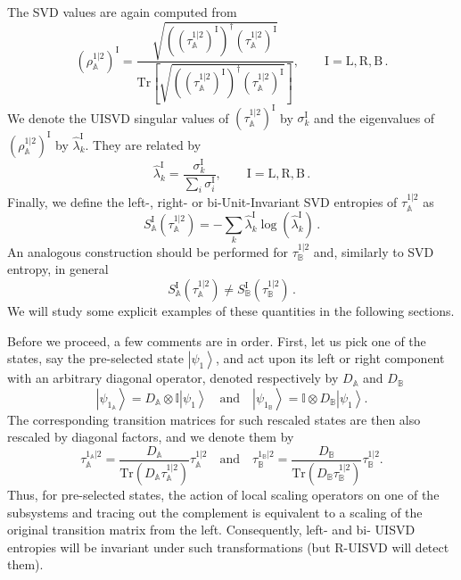 \documentclass[11pt,a4paper]{article}
\newcommand{\be}{\begin{equation}}
\newcommand{\ee}{\end{equation}}
\newcommand{\Tr}{\text{Tr}}
\newcommand{\ket}[1]{\left|#1\right\rangle}
\begin{document}
The SVD values are again computed from
\be
(\rho_\mathbb{A}^{1|2})^\mathrm{I}=\frac{\sqrt{((\tau_\mathbb{A}^{1|2})^\mathrm{I})^\dagger (\tau_\mathbb{A}^{1|2})^\mathrm{I}}}{\Tr\left[\sqrt{((\tau_\mathbb{A}^{1|2})^\mathrm{I})^\dagger (\tau_\mathbb{A}^{1|2})^\mathrm{I}}\right]},\qquad \mathrm{I}=\mathrm{L},\mathrm{R},\mathrm{B}\,.
\ee
We denote the UISVD singular values of $(\tau^{1|2}_\mathbb{A})^\mathrm{I}$ by $\sigma^\mathrm{I}_k$ and the eigenvalues of $(\rho_\mathbb{A}^{1|2})^\mathrm{I}$ by $\hat{\lambda}^\mathrm{I}_k$. They are related by 
\be
\hat{\lambda}^\mathrm{I}_k=\frac{\sigma^\mathrm{I}_k}{\sum_i\sigma^\mathrm{I}_i},\qquad \mathrm{I}=\mathrm{L},\mathrm{R},\mathrm{B}\,.
\ee
Finally, we define the left-, right- or bi-Unit-Invariant SVD entropies of $\tau_\mathbb{A}^{1|2}$ as
\be
S^{\mathrm{I}}_\mathbb{A}(\tau_\mathbb{A}^{1|2})=-\sum_k \hat{\lambda}^\mathrm{I}_k\log(\hat{\lambda}^\mathrm{I}_k)\,.\label{UISVDEntropy}
\ee
An analogous construction should be performed for $\tau_\mathbb{B}^{1|2}$ and, similarly to SVD entropy, in general
\be
S^{\mathrm{I}}_\mathbb{A}(\tau_\mathbb{A}^{1|2})\neq S^{\mathrm{I}}_\mathbb{B}(\tau_\mathbb{B}^{1|2})\,.
\ee
We will study some explicit examples of these quantities in the following sections.

Before we proceed, a few comments are in order. First, let us pick one of the states, say the pre-selected state $\ket{\psi_1}$, and act upon its left or right component with an arbitrary diagonal operator, denoted respectively by $D_\mathbb{A}$ and $D_\mathbb{B}$ 
\begin{equation}\label{eq:local-D-red-trans}
 \ket{\psi_{1_\mathbb{A}}} = D_\mathbb{A}\otimes \mathbb I\ket{\psi_1} \quad \text{and} \quad  \ket{\psi_{1_\mathbb{B}}} = \mathbb I\otimes D_\mathbb{B}\ket{\psi_1}.
\end{equation}
The corresponding transition matrices for such rescaled states are then also rescaled by diagonal factors, and we denote them by
\begin{equation}
\tau^{1_\mathbb{A}|2}_\mathbb{A}= \frac{D_\mathbb{A}}{\Tr{(D_\mathbb{A}\tau_\mathbb{A}^{1|2})}} \tau^{1|2}_\mathbb{A} \quad \text{and} \quad \tau^{1_\mathbb{B}|2}_\mathbb{B}= \frac{D_\mathbb{B}}{\Tr{(D_\mathbb{B}\tau_\mathbb{B}^{1|2})}} \tau^{1|2}_\mathbb{B}. 
\end{equation}
Thus, for pre-selected states, the action of local scaling operators on one of the subsystems and tracing out the complement is equivalent to a scaling of the original transition matrix from the left. Consequently, left- and bi- UISVD entropies will be invariant under such transformations (but R-UISVD will detect them).
\end{document}
